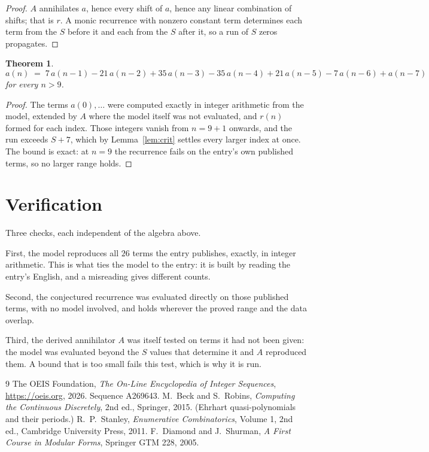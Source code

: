 \documentclass[11pt,a4paper]{article}
\theoremstyle{plain}
\newtheorem{theorem}{Theorem}
\theoremstyle{definition}
\begin{document}
\begin{proof}
$A$ annihilates $a$, hence every shift of $a$, hence any linear combination of shifts; that is
$r$. A monic recurrence with nonzero constant term determines each term from the $S$ before it
and each from the $S$ after it, so a run of $S$ zeros propagates.
\end{proof}

\begin{theorem}
\[
a(n)\;=\;7\,a(n-1) - 21\,a(n-2) + 35\,a(n-3) - 35\,a(n-4) + 21\,a(n-5) - 7\,a(n-6) + a(n-7)
\]
for every $n>9$.
\end{theorem}

\begin{proof}
The terms $a(0),\dots$ were computed exactly in integer arithmetic from the model, extended by
$A$ where the model itself was not evaluated, and $r(n)$ formed for each index. Those integers
vanish from $n=9+1$ onwards, and the run exceeds $S+7$, which by
Lemma~\ref{lem:crit} settles every larger index at once. The bound is exact: at $n=9$ the recurrence fails on the entry's own published terms, so no larger range holds.
\end{proof}

\section{Verification}

Three checks, each independent of the algebra above.

First, the model reproduces all $26$ terms the entry publishes, exactly, in integer
arithmetic. This is what ties the model to the entry: it is built by reading the entry's
English, and a misreading gives different counts.

Second, the conjectured recurrence was evaluated directly on those published terms, with no
model involved, and holds wherever the proved range and the data overlap.

Third, the derived annihilator $A$ was itself tested on terms it had not been given: the model
was evaluated beyond the $S$ values that determine it and $A$ reproduced them. A bound that is
too small fails this test, which is why it is run.

\begin{thebibliography}{9}
 The OEIS Foundation, \emph{The On-Line Encyclopedia of Integer
Sequences}, \url{https://oeis.org}, 2026. Sequence A269643.
 M.~Beck and S.~Robins, \emph{Computing the Continuous Discretely},
2nd ed., Springer, 2015. (Ehrhart quasi-polynomials and their periods.)
 R.~P.~Stanley, \emph{Enumerative Combinatorics}, Volume 1, 2nd ed.,
Cambridge University Press, 2011.
 F.~Diamond and J.~Shurman, \emph{A First Course in Modular Forms},
Springer GTM 228, 2005.
\end{thebibliography}
\end{document}
